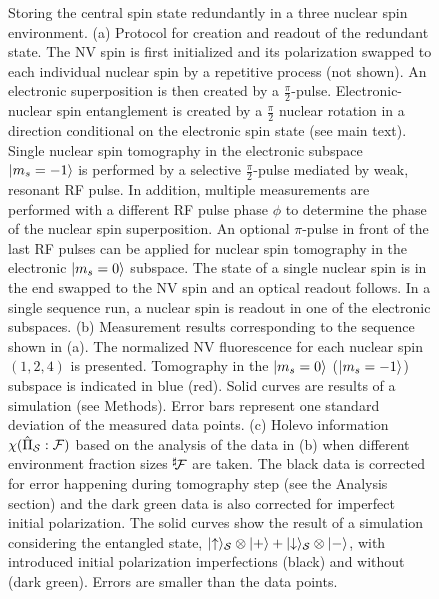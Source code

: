 \documentclass[aps,floatfix,footinbib,superscriptaddress]{revtex4-1}
\begin{document}
\begin{figure}[H]
\centerline{}
\caption{Storing the central spin state redundantly in a three nuclear spin environment. (a) Protocol for creation and readout of the redundant state. The NV spin is first initialized and its polarization swapped to each individual nuclear spin by a repetitive process (not shown). An electronic superposition is then created by a $\frac{\pi}{2}$-pulse. Electronic-nuclear spin entanglement is created by a $\frac{\pi}{2}$ nuclear rotation in a direction conditional on the electronic spin state (see main text). Single nuclear spin tomography in the electronic subspace $|m_s=-1\rangle$ is performed by a selective $\frac{\pi}{2}$-pulse mediated by weak, resonant RF pulse. In addition, multiple measurements are performed with a different RF pulse phase $\phi$ to determine the phase of the nuclear spin superposition. An optional $\pi$-pulse in front of the last RF pulses can be applied for nuclear spin tomography in the electronic $|m_s=0\rangle$ subspace. The state of a single nuclear spin is in the end swapped to the NV spin and an optical readout follows. In a single sequence run, a nuclear spin is readout in one of the electronic subspaces. (b) Measurement results corresponding to the sequence shown in (a). The normalized NV fluorescence for each nuclear spin $(1,2,4)$ is presented. Tomography in the $|m_s=0\rangle$ ($|m_s=-1\rangle$) subspace is indicated in blue (red). Solid curves are results of a simulation (see Methods). Error bars represent one standard deviation of the measured data points. (c) Holevo information $\chi(\hat{\Pi}_{\mathcal{S}}:\mathcal{F})$ based on the analysis of the data in (b) when different environment fraction sizes ${^{\sharp}}\hspace{-0.7mm}\mathcal{F}$ are taken. The black data is corrected for error happening during tomography step (see the Analysis section) and the dark green data is also corrected for imperfect initial polarization. The solid curves show the result of a simulation considering the entangled state, $|\mathord{\uparrow}\rangle_{\mathcal{S}} \otimes |+\rangle+|\mathord{\downarrow}\rangle_{\mathcal{S}} \otimes |-\rangle$, with introduced initial polarization imperfections (black) and without (dark green). Errors are smaller than the data points.} 
\label{fig:3}
\end{figure}
\end{document}
